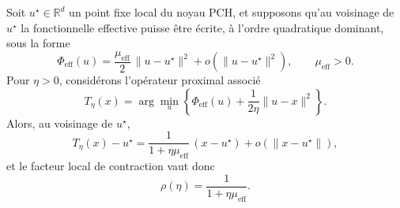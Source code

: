
















































































































\begin{theorem}
\label{thm:effective-law}
Soit $u^\star \in \mathbb R^d$ un point fixe local du noyau PCH, et supposons qu'au voisinage de $u^\star$ la fonctionnelle effective puisse être écrite, à l'ordre quadratique dominant, sous la forme
\[
\Phi_{\mathrm{eff}}(u)
=
\frac{\mu_{\mathrm{eff}}}{2}\,\|u-u^\star\|^2
+
o\!\left(\|u-u^\star\|^2\right),
\qquad \mu_{\mathrm{eff}}>0.
\]
Pour $\eta>0$, considérons l'opérateur proximal associé
\[
T_\eta(x)
=
\arg\min_u
\left\{
\Phi_{\mathrm{eff}}(u)
+
\frac{1}{2\eta}\|u-x\|^2
\right\}.
\]
Alors, au voisinage de $u^\star$,
\[
T_\eta(x)-u^\star
=
\frac{1}{1+\eta \mu_{\mathrm{eff}}}\,(x-u^\star)
+
o\!\left(\|x-u^\star\|\right),
\]
et le facteur local de contraction vaut donc
\[
\rho(\eta)=\frac{1}{1+\eta\mu_{\mathrm{eff}}}.
\]
\end{theorem}

